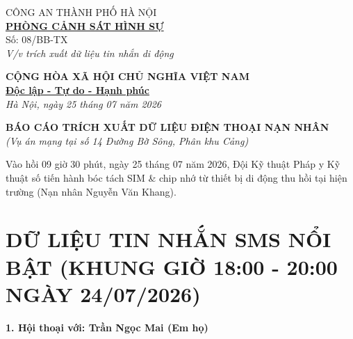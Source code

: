 \documentclass[12pt,a4paper]{article}
\begin{document}
\noindent
\begin{minipage}[t]{0.45\textwidth}
    \begin{center}
        \small
        CÔNG AN THÀNH PHỐ HÀ NỘI\\
        \textbf{\underline{PHÒNG CẢNH SÁT HÌNH SỰ}}\\[0.1cm]
        Số: 08/BB-TX\\
        \textit{V/v trích xuất dữ liệu tin nhắn di động}
    \end{center}
\end{minipage}
\hfill
\begin{minipage}[t]{0.52\textwidth}
    \begin{center}
        \small
        \textbf{CỘNG HÒA XÃ HỘI CHỦ NGHĨA VIỆT NAM}\\
        \textbf{\underline{Độc lập - Tự do - Hạnh phúc}}\\[0.1cm]
        \textit{Hà Nội, ngày 25 tháng 07 năm 2026}
    \end{center}
\end{minipage}

\vspace{0.6cm}

\begin{center}
    \textbf{\large BÁO CÁO TRÍCH XUẤT DỮ LIỆU ĐIỆN THOẠI NẠN NHÂN}\\
    \textit{(Vụ án mạng tại số 14 Đường Bờ Sông, Phân khu Cảng)}
\end{center}

\vspace{0.3cm}

\noindent Vào hồi 09 giờ 30 phút, ngày 25 tháng 07 năm 2026, Đội Kỹ thuật Pháp y Kỹ thuật số tiến hành bóc tách SIM \& chip nhớ từ thiết bị di động thu hồi tại hiện trường (Nạn nhân Nguyễn Văn Khang).\\

\section*{DỮ LIỆU TIN NHẮN SMS NỔI BẬT (KHUNG GIỜ 18:00 - 20:00 NGÀY 24/07/2026)}

\noindent \textbf{1. Hội thoại với: Trần Ngọc Mai (Em họ)}
\vspace{0.1cm}
\end{document}
